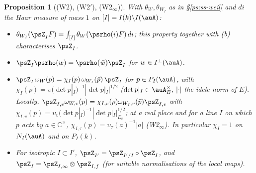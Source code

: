 \documentclass[10pt]{amsart}
\newtheorem{proposition}[theorem]{Proposition}
\theoremstyle{definition}
\theoremstyle{remark}
\newcommand{\C}{\mathbb C}
\begin{document}
\begin{proposition}[(W2), (W2$'$), (W2$_\infty$)]\label{pwf:W2}
With $\theta_W,\theta_{W_I}$ as in \S\ref{ps:ss-weil} and $di$ the Haar measure of mass $1$ on
$[I]=I(k)\backslash I(\auA)$:
\begin{itemize}
\item[(a)] $\theta_{W_I}(\psZ_IF)=\int_{[I]}\theta_W(\psrho(i)F)\,di$; this property together with
\textup{(b)} characterises $\psZ_I$.
\item[(b)] $\psZ_I\psrho(w)=\psrho(\bar w)\psZ_I$ for $w\in I^\perp(\auA)$.
\item[(c)] $\psZ_I\,\omega_W(p)=\chi_I(p)\,\omega_{W_I}(\bar p)\,\psZ_I$ for $p\in P_I(\auA)$, with
$\chi_I(p)=\upsilon(\det p|_I)^{-1}|\det p|_I|^{1/2}$ ($\det p|_I\in\auA_E^\times$, $|\cdot|$ the
idele norm of $E$). Locally, $\psZ_{I,v}\omega_{W,v}(p)=\chi_{I,v}(p)\omega_{W_I,v}(\bar p)
\psZ_{I,v}$ with $\chi_{I,v}(p)=\upsilon_v(\det p|_I)^{-1}|\det p|_I|_{E_v}^{1/2}$; at a real place
and for a line $I$ on which $p$ acts by $a\in\C^\times$, $\chi_{I,\tau}(p)=\upsilon_\tau(a)^{-1}|a|$
\textup{(W2$_\infty$)}. In particular $\chi_I=1$ on $N_I(\auA)$ and on $P_I(k)$.
\item[(d)] For isotropic $I\subset I'$, $\psZ_{I'}=\psZ_{I'/I}\circ\psZ_I$, and $\psZ_I=\psZ_{I,\infty}
\otimes\psZ_{I,f}$ (for suitable normalisations of the local maps).
\end{itemize}
\end{proposition}
\end{document}
